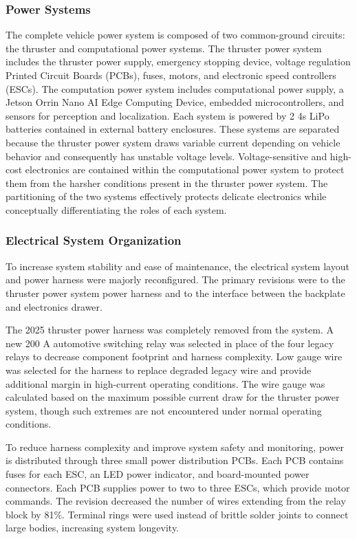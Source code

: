 \documentclass[conference]{IEEEtran}
\begin{document}
\subsubsection{Power Systems}
The complete vehicle power system is composed of two common-ground circuits: the thruster and computational power systems. The thruster power system includes the thruster power supply, emergency stopping device, voltage regulation Printed Circuit Boards (PCBs), fuses, motors, and electronic speed controllers (ESCs). The computation power system includes computational power supply, a Jetson Orrin Nano AI Edge Computing Device, embedded microcontrollers, and sensors for perception and localization. Each system is powered by 2 4s LiPo batteries contained in external battery enclosures. These systems are separated because the thruster power system draws variable current depending on vehicle behavior and consequently has unstable voltage levels. Voltage-sensitive and high-cost electronics are contained within the computational power system to protect them from the harsher conditions present in the thruster power system. The partitioning of the two systems effectively protects delicate electronics while conceptually differentiating the roles of each system.

\subsubsection{Electrical System Organization}
To increase system stability and ease of maintenance, the electrical system layout and power harness were majorly reconfigured. The primary revisions were to the thruster power system power harness and to the interface between the backplate and electronics drawer.

The 2025 thruster power harness was completely removed from the system. A new 200 A automotive switching relay was selected in place of the four legacy relays to decrease component footprint and harness complexity. Low gauge wire was selected for the harness to replace degraded legacy wire and provide additional margin in high-current operating conditions. The wire gauge was calculated based on the maximum possible current draw for the thruster power system, though such extremes are not encountered under normal operating conditions.

To reduce harness complexity and improve system safety and monitoring, power is distributed through three small power distribution PCBs. Each PCB contains fuses for each ESC, an LED power indicator, and board-mounted power connectors. Each PCB supplies power to two to three ESCs, which provide motor commands. The revision decreased the number of wires extending from the relay block by 81\%. Terminal rings were used instead of brittle solder joints to connect large bodies, increasing system longevity. 
\end{document}
